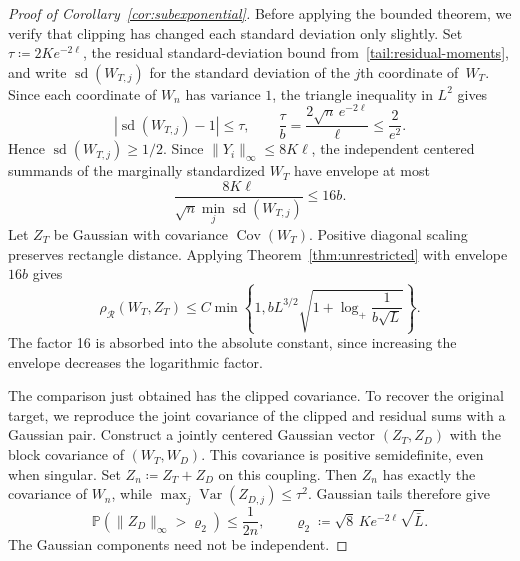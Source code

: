 \documentclass[11pt,letterpaper]{article}
\theoremstyle{remark}
\newcommand{\Pp}{\mathbb P}
\newcommand{\Cov}{\operatorname{Cov}}
\newcommand{\Var}{\operatorname{Var}}
\newcommand{\rh}{\rho_{\mathcal R}}
\begin{document}
\begin{proof}[Proof of Corollary~\ref{cor:subexponential}]
Before applying the bounded theorem, we verify that clipping has
changed each standard deviation only slightly. Set
\(\tau\coloneqq 2Ke^{-2\ell}\), the residual standard-deviation
bound from~\eqref{tail:residual-moments}, and write \(\operatorname{sd}(W_{T,j})\) for the
standard deviation of the \(j\)th coordinate of~\(W_T\).
Since each coordinate of \(W_n\) has variance \(1\), the triangle
inequality in \(L^2\) gives
\[
 |\operatorname{sd}(W_{T,j})-1|\le\tau,
 \qquad \frac\tau b=\frac{2\sqrt n\,e^{-2\ell}}\ell
 \le\frac2{e^2}.
\]
Hence \(\operatorname{sd}(W_{T,j})\ge1/2\). Since \(\|Y_i\|_\infty\le8K\ell\), the
independent centered summands of the marginally standardized \(W_T\)
have envelope at most
\[
 \frac{8K\ell}{\sqrt n\min_j\operatorname{sd}(W_{T,j})}\le16b.
\]
Let \(Z_T\) be Gaussian with covariance \(\Cov(W_T)\).
Positive diagonal scaling preserves rectangle distance. Applying
Theorem~\ref{thm:unrestricted} with envelope \(16b\) gives
\begin{equation}
 \rh(W_T,Z_T)\le C\min\left\{1,
 bL^{3/2}\sqrt{1+\log_+\frac1{b\sqrt L}}\right\}.
 \label{tail:bounded-comparison}
\end{equation}
The factor 16 is absorbed into the absolute constant, since increasing
the envelope decreases the logarithmic factor.

The comparison just obtained has the clipped covariance. To recover
the original target, we reproduce the joint covariance of the clipped
and residual sums with a Gaussian pair. Construct a jointly centered Gaussian vector \((Z_T,Z_D)\) with the
block covariance of \((W_T,W_D)\). This covariance is positive
semidefinite, even when singular. Set \(Z_n\coloneqq Z_T+Z_D\) on this coupling.
Then \(Z_n\) has exactly the covariance of \(W_n\), while
\(\max_j\Var(Z_{D,j})\le\tau^2\). Gaussian tails therefore give
\begin{equation}
 \Pp(\|Z_D\|_\infty>\varrho_2)\le\frac1{2n},\qquad
 \varrho_2\coloneqq \sqrt8\,Ke^{-2\ell}\sqrt{\bar L}.
 \label{tail:Gaussian-coupling}
\end{equation}
The Gaussian components need not be independent.


\end{proof}
\end{document}
